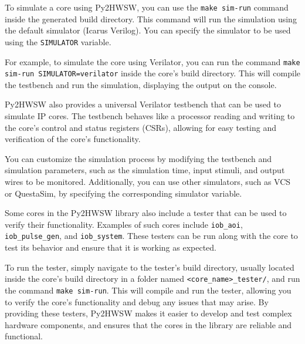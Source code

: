%

To simulate a core using Py2HWSW, you can use the \texttt{make sim-run} command inside the generated build directory. This command will run the simulation using the default simulator (Icarus Verilog).
You can specify the simulator to be used using the \texttt{SIMULATOR} variable.

For example, to simulate the core using Verilator, you can run the command \texttt{make sim-run SIMULATOR=verilator} inside the core's build directory. This will compile the testbench and run the simulation, displaying the output on the console.

Py2HWSW also provides a universal Verilator testbench that can be used to simulate IP cores. The testbench behaves like a processor reading and writing to the core's control and status registers (CSRs), allowing for easy testing and verification of the core's functionality.

You can customize the simulation process by modifying the testbench and simulation parameters, such as the simulation time, input stimuli, and output wires to be monitored. Additionally, you can use other simulators, such as VCS or QuestaSim, by specifying the corresponding simulator variable.

Some cores in the Py2HWSW library also include a tester that can be used to verify their functionality. Examples of such cores include \texttt{iob\_aoi}, \texttt{iob\_pulse\_gen}, and \texttt{iob\_system}. These testers can be run along with the core to test its behavior and ensure that it is working as expected.

To run the tester, simply navigate to the tester's build directory, usually located inside the core's build directory in a folder named \texttt{<core\_name>\_tester/}, and run the command \texttt{make sim-run}.
This will compile and run the tester, allowing you to verify the core's functionality and debug any issues that may arise.
By providing these testers, Py2HWSW makes it easier to develop and test complex hardware components, and ensures that the cores in the library are reliable and functional.

